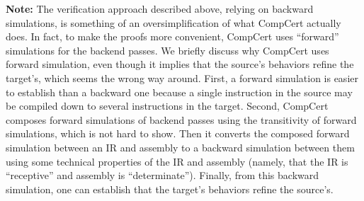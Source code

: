\textbf{Note:} The verification approach described above, relying on backward simulations, is
something of an oversimplification of what CompCert actually does.  In fact, to make the proofs more
convenient, CompCert uses ``forward'' simulations for the backend passes.  We briefly discuss why
CompCert uses forward simulation, even though it implies that the source's behaviors refine the
target's, which seems the wrong way around.  First, a forward simulation is easier to establish than
a backward one because a single instruction in the source may be compiled down to several
instructions in the target. Second, CompCert composes forward simulations of backend passes using
the transitivity of forward simulations, which is not hard to show. Then it converts the composed
forward simulation between an IR and assembly to a backward simulation between them using some
technical properties of the IR and assembly (namely, that the IR is ``receptive'' and assembly is
``determinate''). Finally, from this backward simulation, one can establish that the target's
behaviors refine the source's.




%

